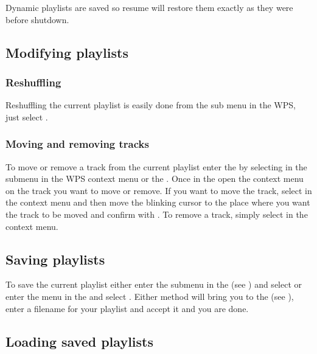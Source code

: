 Dynamic playlists are saved so resume will restore them exactly as they
were before shutdown.

  
\subsection{Modifying playlists}
\subsubsection{Reshuffling}
Reshuffling the current playlist is easily done from the 
sub menu in the WPS, just select .

\subsubsection{Moving and removing tracks}
To move or remove a track from the current playlist enter the
 by selecting  in the
 submenu in the WPS context menu or the .
Once in the  open the context menu on the track you
want to move or remove. If you want to move the track, select  in
the context menu and then move the blinking cursor to the place where you want
the track to be moved and confirm with \ActionStdOk. To remove a track, simply
select  in the context menu.

\subsection{Saving playlists}
To save the current playlist either enter the  submenu
in the  (see ) and
select  or enter the
 menu in the  and select
.
Either method will bring you to the  (see
), enter a filename for your playlist and
accept it and you are done.

\subsection{Loading saved playlists}
